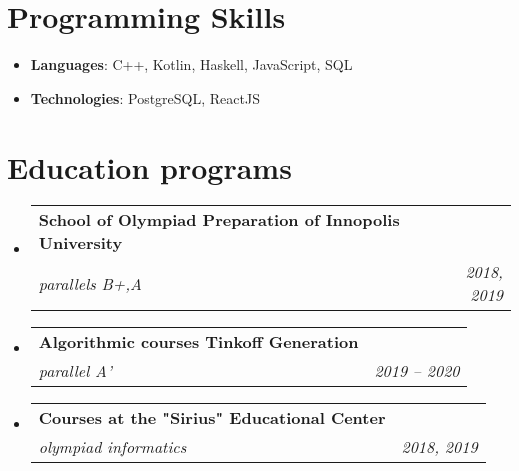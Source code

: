 \documentclass[letterpaper,11pt]{article}
\makeatletter
\newcommand{\resumeSubheading}[4]{
  \vspace{-1pt}\item
    \begin{tabular*}{0.97\textwidth}{l@{\extracolsep{\fill}}r}
      \textbf{#1} & #2 \\
      \textit{\small#3} & \textit{\small #4} \\
    \end{tabular*}\vspace{-5pt}
}
\newcommand{\resumeSubHeadingListStart}{\begin{itemize}[leftmargin=*]}
\newcommand{\resumeSubHeadingListEnd}{\end{itemize}}
\makeatother
\begin{document}
\section{Programming Skills}
  \resumeSubHeadingListStart
    \item{
      \textbf{Languages}{: C++, Kotlin, Haskell, JavaScript, SQL }
    }
     \item{
      \textbf{Technologies}{: PostgreSQL, ReactJS }
    }
  \resumeSubHeadingListEnd

\section{Education programs}
  \resumeSubHeadingListStart
    \resumeSubheading
      {School of Olympiad Preparation of Innopolis University}{}{parallels B+,A}{2018, 2019}
    \resumeSubheading
      {Algorithmic courses Tinkoff Generation}{}
      {parallel A'}{2019 -- 2020}  
           
        \resumeSubheading
      {Courses at the "Sirius" Educational Center
      }{}
      {olympiad informatics}{2018, 2019}  
           
  \resumeSubHeadingListEnd

\end{document}
